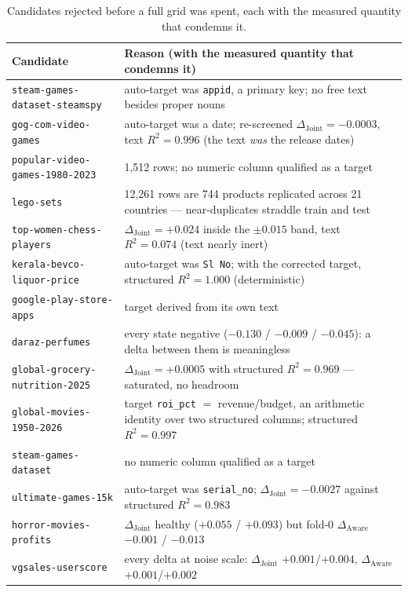 \documentclass[10pt,letterpaper]{article}
\newcommand{\dj}{\Delta_{\mathrm{Joint}}}
\newcommand{\da}{\Delta_{\mathrm{Aware}}}
\begin{document}
\begin{table}[H]
\centering\small
\caption{Candidates rejected before a full grid was spent, each with the measured quantity
that condemns it.}
\begin{tabular}{p{}p{}}
\toprule
Candidate & Reason (with the measured quantity that condemns it) \\
\midrule
\texttt{steam-games-dataset-steamspy} & auto-target was \texttt{appid}, a primary key; no free text besides proper nouns \\
\texttt{gog-com-video-games} & auto-target was a date; re-screened $\dj = -0.0003$, text $R^2 = 0.996$ (the text \emph{was} the release dates) \\
\texttt{popular-video-games-1980-2023} & 1{,}512 rows; no numeric column qualified as a target \\
\texttt{lego-sets} & 12{,}261 rows are 744 products replicated across 21 countries --- near-duplicates straddle train and test \\
\texttt{top-women-chess-players} & $\dj = +0.024$ inside the $\pm 0.015$ band, text $R^2 = 0.074$ (text nearly inert) \\
\texttt{kerala-bevco-liquor-price} & auto-target was \texttt{Sl No}; with the corrected target, structured $R^2 = 1.000$ (deterministic) \\
\texttt{google-play-store-apps} & target derived from its own text \\
\texttt{daraz-perfumes} & every state negative ($-0.130$ / $-0.009$ / $-0.045$): a delta between them is meaningless \\
\texttt{global-grocery-nutrition-2025} & $\dj = +0.0005$ with structured $R^2 = 0.969$ --- saturated, no headroom \\
\texttt{global-movies-1950-2026} & target \texttt{roi\_pct} $=$ revenue/budget, an arithmetic identity over two structured columns; structured $R^2 = 0.997$ \\
\texttt{steam-games-dataset} & no numeric column qualified as a target \\
\texttt{ultimate-games-15k} & auto-target was \texttt{serial\_no}; $\dj = -0.0027$ against structured $R^2 = 0.983$ \\
\texttt{horror-movies-profits} & $\dj$ healthy ($+0.055$ / $+0.093$) but fold-0 $\da$ $-0.001$ / $-0.013$ \\
\texttt{vgsales-userscore} & every delta at noise scale: $\dj$ $+0.001$/$+0.004$, $\da$ $+0.001$/$+0.002$ \\
\bottomrule
\end{tabular}
\end{table}
\end{document}
